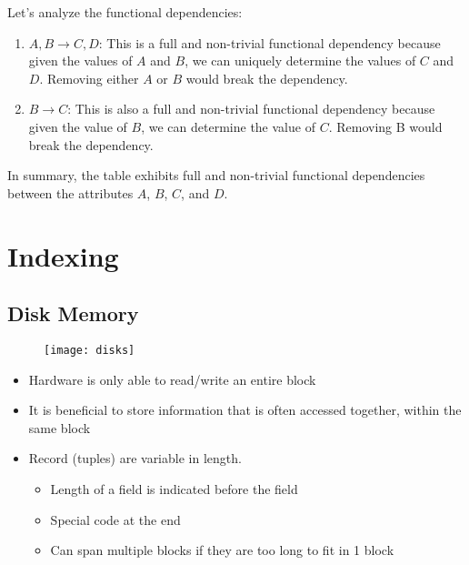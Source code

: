 Let's analyze the functional dependencies:

\begin{enumerate}
    \item $A, B \rightarrow C, D$: This is a full and non-trivial functional dependency because given the values of $A$ and $B$, we can uniquely determine the values of $C$ and $D$. Removing either $A$ or $B$ would break the dependency.
    \item $B \rightarrow C$: This is also a full and non-trivial functional dependency because given the value of $B$, we can determine the value of $C$. Removing B would break the dependency.
\end{enumerate}

In summary, the table exhibits full and non-trivial functional dependencies between the attributes $A$, $B$, $C$, and $D$.

\chapter{Indexing}

\section{Disk Memory}

\begin{minipage}{0.48\textwidth}
	\begin{figure}[H]
		\centering
		\texttt{[image: disks]}
	\end{figure}
\end{minipage}
\hfill
\begin{minipage}{0.5\textwidth}
	\begin{itemize}
	    \item Hardware is only able to read/write an entire block
	    \item It is beneficial to store information that is often accessed together, within the same block
	    \item Record (tuples) are variable in length.
	    \begin{itemize}
	        \item Length of a field is indicated before the field
	        \item Special code at the end
	        \item Can span multiple blocks if they are too long to fit in 1 block
	    \end{itemize}
	\end{itemize}
\end{minipage}


